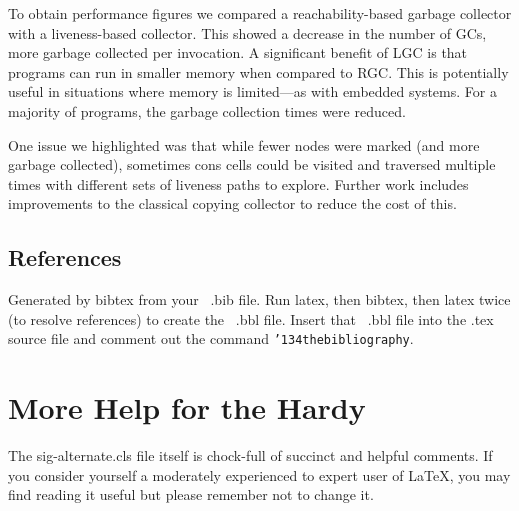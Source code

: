 \documentclass[9pt]{sigplanconf}
\begin{document}
\begin{enumerate}
To obtain performance figures we compared a reachability-based garbage
collector with a liveness-based  collector.  This showed a decrease in
the  number   of  GCs,  more  garbage  collected   per  invocation.  A
significant benefit of LGC is that programs can run in smaller memory when
compared to RGC. This is potentially useful in situations where memory
is limited---as with embedded systems. For a majority of programs, the
garbage collection times were reduced.

One issue we  highlighted was that while fewer  nodes were marked (and
more garbage collected), sometimes  cons cells could be visited and
traversed  multiple times  with different  sets of  liveness  paths to
explore.  Further work includes  improvements to the classical copying
collector to reduce the cost of this.




\subsection{References}
{}


Generated by bibtex from your ~.bib file.  Run latex,
then bibtex, then latex twice (to resolve references)
to create the ~.bbl file.  Insert that ~.bbl file into
the .tex source file and comment out
the command \texttt{{\char'134}thebibliography}.
\section{More Help for the Hardy}
The sig-alternate.cls file itself is chock-full of succinct
and helpful comments.  If you consider yourself a moderately
experienced to expert user of \LaTeX, you may find reading
it useful but please remember not to change it.
\end{enumerate}









\end{document}
